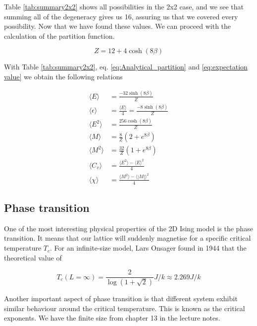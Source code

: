 \documentclass[english,notitlepage,reprint,nofootinbib]{revtex4-2}  %
\begin{document}
	Table \ref{tab:summary2x2} shows all possibilities in the 2x2 case, and we see that summing all
	of the degeneracy gives us 16, assuring us that we covered every possibility. Now that
	we have found these values. We can proceed with the calculation of the partition function.

	\begin{equation}
		Z = 12 + 4\cosh(8\beta) \label{eq:Analytical_partition}
	\end{equation}


	With Table \ref{tab:summary2x2}, eq. \ref{eq:Analytical_partition} and \ref{eq:expectation value} we obtain the following relations

	\begin{align*} \label{eq:sol}
		\langle E \rangle &= \frac{-32\sinh(8\beta)}{Z}  \\
		\langle \epsilon \rangle &= \frac{\langle E \rangle}{4} = \frac{-8\sinh(8\beta)}{Z} \\
		\langle E^2 \rangle &= \frac{256 \cosh(8\beta)}{Z} \\
		\langle M \rangle &= \frac{8}{Z} (2 + e^{8\beta}) \\
		\langle M^2 \rangle &= \frac{32}{Z} (1 + e^{8\beta}) \\
		\langle C_v \rangle &= \frac{\langle E^2 \rangle - \langle E \rangle^2}{4} \\
		\langle \chi \rangle &=  \frac{\langle M^2 \rangle - \langle |M| \rangle^2}{4}
	\end{align*}


	\subsection{Phase transition}\label{subsec:phase transition}
	One of the most interesting physical properties of the 2D Ising model is the phase transition.
	It means that our lattice will suddenly magnetise for a specific critical temperature $T_c$. For an infinite-size model, Lars Onsager found in 1944 that the theoretical value of

	\begin{equation}
		T_c(L=\infty)=\frac{2}{\log(1 + \sqrt{2})} J/k \approx 2.269 J/k \label{Tc_theo}
	\end{equation}

	Another important aspect of phase transition is that different system exhibit similar
	behaviour around the critical temperature. This is known as the critical exponents. We have the finite size from chapter 13 in the lecture notes\cite{Morten15}.
\end{document}
